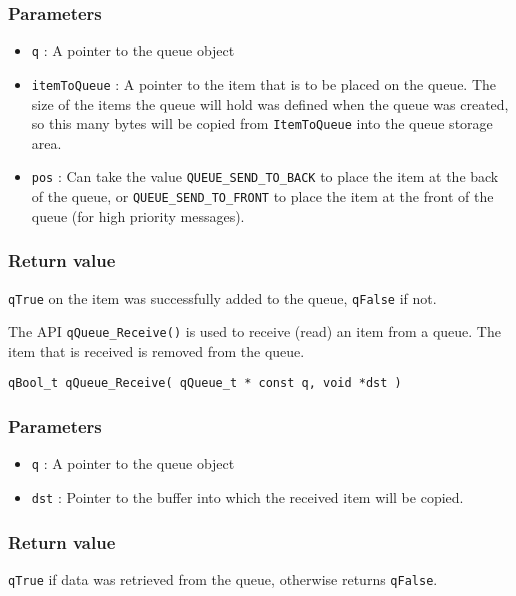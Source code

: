\subsubsection*{Parameters}
\begin{itemize}
    \item \lstinline{q} : A pointer to the queue object
    \item \lstinline{itemToQueue} : A pointer to the item that is to be placed on the queue. The size of the items the queue will hold was defined when the queue was created, so this many bytes will be copied from \lstinline{ItemToQueue} into the queue storage area. 
    \item \lstinline{pos} : Can take the value \lstinline{QUEUE_SEND_TO_BACK} to place the item at the back of the queue, or \lstinline{QUEUE_SEND_TO_FRONT} to place the item at the front of the queue (for high priority messages).
\end{itemize}  

\subsubsection*{Return value}
\lstinline{qTrue} on the item was successfully added to the queue, \lstinline{qFalse} if not.

\noindent\hrulefill  

The API \lstinline{qQueue_Receive()}  is used to receive (read) an item from a queue. The item that is received is removed from the queue. 
\medskip

\begin{lstlisting}[style=CStyle]
qBool_t qQueue_Receive( qQueue_t * const q, void *dst )
\end{lstlisting}

\subsubsection*{Parameters}
\begin{itemize}
    \item \lstinline{q} : A pointer to the queue object
    \item \lstinline{dst} : Pointer to the buffer into which the received item will be copied.
\end{itemize}  

\subsubsection*{Return value}
\lstinline{qTrue} if data was retrieved from the queue, otherwise returns \lstinline{qFalse}.

